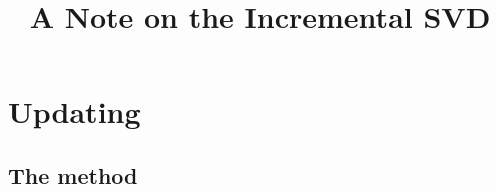 \documentclass[11pt,a4paper]{article}
\theoremstyle{mybreak}
\numberwithin{dummy}{section}
\theoremstyle{plain}
\theoremstyle{plain}
\theoremstyle{plain}
\theoremstyle{plain}
\theoremstyle{MyNonumberplain}
\newcommand{\0}{\M{0}}
\newenvironment{changemargin}[2]{%
  \begin{list}{}{%
      \setlength{\topsep}{0pt}%
      \setlength{\leftmargin}{#1}%
      \setlength{\rightmargin}{#2}%
      \setlength{\listparindent}{\parindent}%
      \setlength{\itemindent}{\parindent}%
      \setlength{\parsep}{\parskip}%
    }%
  \item[]}
  {\end{list}}
\newenvironment{keywords}{%
  \begingroup
  \def\and{\unskip\space\textperiodcentered\space\ignorespaces}
  \begin{changemargin}{\leftmargin}{\leftmargin}
    \small\noindent\emph{Keywords}:}
  {\end{changemargin}
  \endgroup
}
\begin{document}
\title{A Note on the Incremental SVD}

\date{}

\author{}


\maketitle





\section{Updating}

\subsection{The method}
\end{document}
